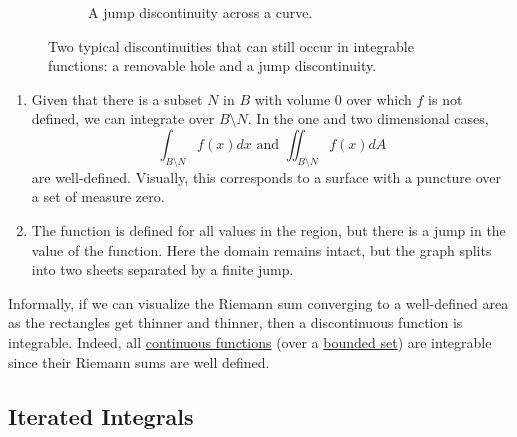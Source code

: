 \begin{figure}[H]
\begin{subfigure}[b]{0.48\textwidth}
      \caption{A jump discontinuity across a curve.}
    \end{subfigure}
    \caption{Two typical discontinuities that can still occur in integrable functions: a removable hole and a jump discontinuity.}
  \end{figure}

  \begin{enumerate}
    \item Given that there is a subset $N$ in $B$ with volume $0$ over which $f$ is not defined, we can integrate over $B \setminus N$. In the one and two dimensional cases, 
    \begin{equation}
      \int_{B \setminus N} f(x) dx \text{ and } \iint_{B\setminus N} f(x) dA
    \end{equation}
    are well-defined. Visually, this corresponds to a surface with a puncture over a set of measure zero. 
    \item The function is defined for all values in the region, but there is a jump in the value of the function. 
    Here the domain remains intact, but the graph splits into two sheets separated by a finite jump. 
  \end{enumerate}
  Informally, if we can visualize the Riemann sum converging to a well-defined area as the rectangles get thinner and thinner, then a discontinuous function is integrable. Indeed, all \hyperref[pst-def:continuous_func]{continuous functions} (over a \hyperref[pst-def:bounded-set]{bounded set}) are integrable since their Riemann sums are well defined. 

\subsection{Iterated Integrals} 

